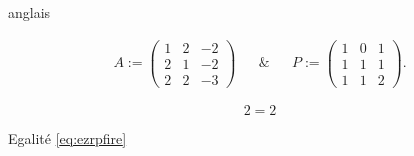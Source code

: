 anglais

\[\begin{aligned}
\label{eq:ezrpfire}
&A:=  \begin{pmatrix}1 & 2 & -2\\2 & 1 & -2\\2 & 2 & -3\end{pmatrix}&
& \& & 
&P:=  \begin{pmatrix}1 & 0 & 1\\1 & 1 & 1\\1 & 1 & 2\end{pmatrix}.&
\end{aligned}\]

\[2=2\]

Egalité \protect\hyperlink{eq:ezrpfire}{{[}eq:ezrpfire{]}}
